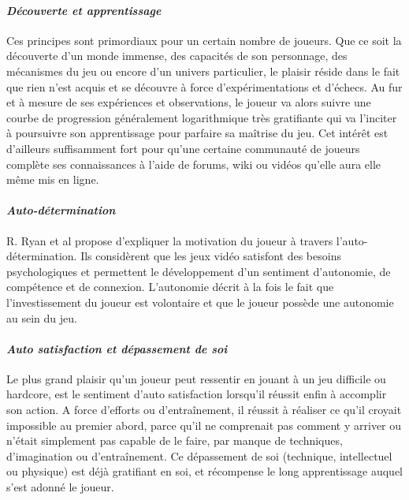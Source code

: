 			\paragraph{\emph{Découverte et apprentissage}  \\ \quad}
Ces principes sont primordiaux pour un certain nombre de joueurs.  Que ce soit la découverte d’un monde immense, des capacités de son personnage, des mécanismes du jeu ou encore d’un univers particulier, le plaisir réside dans le fait que rien n’est acquis et se découvre à force d’expérimentations et d’échecs. Au fur et à mesure de ses expériences et observations, le joueur va alors suivre une courbe de progression généralement logarithmique très gratifiante qui va l’inciter à poursuivre son apprentissage pour parfaire sa maîtrise du jeu. Cet intérêt est d’ailleurs suffisamment fort pour qu’une certaine communauté de joueurs complète ses connaissances à l’aide de forums, wiki ou vidéos qu’elle aura elle même mis en ligne.

			\paragraph{\emph{Auto-détermination} \\ \quad}
R. Ryan et al propose d’expliquer la motivation du joueur à travers l’auto-détermination. Ils considèrent que les jeux vidéo satisfont des besoins psychologiques et permettent le développement d’un sentiment d’autonomie, de compétence et de connexion. L’autonomie décrit à la fois le fait que l’investissement du joueur est volontaire et que le joueur possède une autonomie au sein du jeu.

			\paragraph{\emph{Auto satisfaction et dépassement de soi} \\ \quad}
Le plus grand plaisir qu’un joueur peut ressentir en jouant à un jeu difficile ou hardcore, est le sentiment d’auto satisfaction lorsqu’il réussit enfin à accomplir son action. A force d’efforts ou d’entraînement, il réussit à réaliser ce qu’il croyait impossible au premier abord, parce qu’il ne comprenait pas comment y arriver ou n’était simplement pas capable de le faire, par manque de techniques, d’imagination ou d’entraînement. Ce dépassement de soi (technique, intellectuel ou physique) est déjà gratifiant en soi, et récompense le long apprentissage auquel s’est adonné le joueur.

